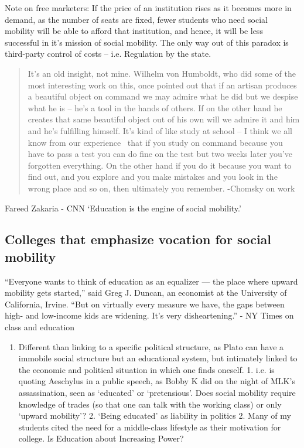 Note on free marketers: If the price of an institution rises as it becomes more in demand, as the number of seats are fixed, fewer students who need social mobility will be able to afford that institution, and hence, it will be less successful in it's mission of social mobility. The only way out of this paradox is third-party control of costs -- i.e. Regulation by the state.

\begin{quote}

It's an old insight, not mine. Wilhelm von Humboldt, who did some of the most interesting work on this, once pointed out that if an artisan produces a beautiful object on command we may admire what he did but we despise what he is – he's a tool in the hands of others. If on the other hand he creates that same beautiful object out of his own will we admire it and him and he's fulfilling himself. It's kind of like study at school – I think we all know from our experience  that if you study on command because you have to pass a test you can do fine on the test but two weeks later you've forgotten everything. On the other hand if you do it because you want to find out, and you explore and you make mistakes and you look in the wrong place and so on, then ultimately you remember. -Chomsky on work
\end{quote}

Fareed Zakaria - CNN `Education is the engine of social mobility.' 

\subsection{Colleges that emphasize vocation for social mobility}
\label{collegesthatemphasizevocationforsocialmobility}

``Everyone wants to think of education as an equalizer --- the place where upward mobility gets started,'' said Greg J. Duncan, an economist at the University of California, Irvine. ``But on virtually every measure we have, the gaps between high- and low-income kids are widening. It's very disheartening.'' - NY Times on class and education

\begin{enumerate}
\item Different than linking to a specific political structure, as Plato can have a immobile social structure but an educational system, but intimately linked to the economic and political situation in which one finds oneself.
 1. i.e. is quoting Aeschylus in a public speech, as Bobby K did on the night of MLK's assassination, seen as `educated' or `pretensious'. Does social mobility require knowledge of trades (so that one can talk with the working class) or only `upward mobility'?
 2. `Being educated' as liability in politics
 2. Many of my students cited the need for a middle-class lifestyle as their motivation for college.
Is Education about Increasing Power?

\end{enumerate}

